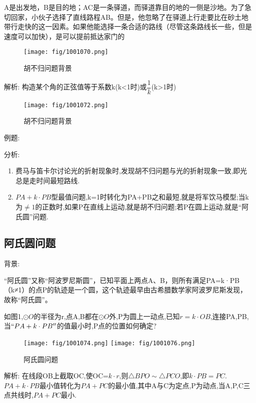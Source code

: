 \documentclass[cn,blue,10pt]{elegantbook}
\begin{document}
A是出发地，B是目的地；AC是一条驿道，而驿道靠目的地的一侧是沙地。为了急切回家，小伙子选择了直线路程AB。但是，他忽略了在驿道上行走要比在砂土地带行走快的这一因素。如果他能选择一条合适的路线（尽管这条路线长一些，但是速度可以加快），是可以提前抵达家门的
\begin{figure}[H]
    \centering
    \texttt{[image: fig/1001070.png]}
    \caption{胡不归问题背景}%
    \label{fig:倒数型相似}
\end{figure}

解析:
构造某个角的正弦值等于系数k(k<1时)或\(\dfrac{1}{k}\)(k>1时)
\begin{figure}[H]
    \centering
    \texttt{[image: fig/1001072.png]}
    \caption{胡不归问题背景}%
    \label{fig:倒数型相似}
\end{figure}

例题:


分析: 
\begin{enumerate}
    \item 费马与笛卡尔讨论光的折射现象时,发现胡不归问题与光的折射现象一致,即光总是走时间最短路线.
    \item \(PA+k\cdot PB\)型最值问题,k=1时转化为PA+PB之和最短,就是将军饮马模型;当k为\(\ne 1\)的正数时,如果P在直线上运动,就是胡不归问题;若P在圆上运动,就是``阿氏圆''问题.
\end{enumerate}


\subsection{阿氏圆问题}%
\label{sub:阿氏圆问题}

背景:

“阿氏圆”又称“阿波罗尼斯圆”，已知平面上两点A、B，则所有满足PA=k·PB（k≠1）的点P的轨迹是一个圆，这个轨迹最早由古希腊数学家阿波罗尼斯发现，故称“阿氏圆”。

如图1,\(\odot O\)的半径为r,点A,B都在\(\odot O\)外,P为圆上一动点,已知\(r=k\cdot OB\),连接PA,PB,当\(``PA+k\cdot PB''\)的值最小时,P点的位置如何确定?
\begin{figure}[H]
    \centering
    \texttt{[image: fig/1001074.png]}
    \texttt{[image: fig/1001076.png]}
    \caption{阿氏圆问题}%
    \label{fig:阿氏圆问题}
\end{figure}

解析:
在线段OB上截取OC,使OC=\(k\cdot r\),则\(\triangle BPO\sim \triangle PCO\),即\(k\cdot PB=PC\).\(PA+k\cdot PB\)最小值转化为\(PA+PC\)的最小值,其中A与C为定点,P为动点,当A,P,C三点共线时,\(PA+PC\)最小.
\end{document}
